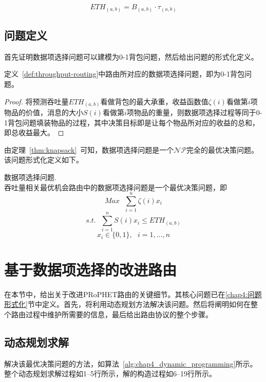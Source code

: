 \begin{equation}
ETH_{(a,b)}=B_{(a,b)}\cdot\tau_{(a,b)}
\label{eq:eth}
\end{equation}

\subsection{问题定义}

首先证明数据项选择问题可以建模为0-1背包问题，然后给出问题的形式化定义。

\begin{theorem}
\label{thm:knapsack}
定义~\ref{def:throughput-routing}中路由所对应的数据项选择问题，即为0-1背包问题。
\end{theorem}
\begin{proof}
将预测吞吐量$ETH_{(a,b)}$看做背包的最大承重，收益函数值$\zeta(i)$看做第$i$项物品的价值，消息的大小$S(i)$看做第$i$项物品的重量，则数据项选择过程等同于0-1背包问题填装物品的过程，其中决策目标即是让每个物品所对应的收益的总和，即总收益最大。
\end{proof}

由定理~\ref{thm:knapsack}~可知，数据项选择问题是一个$\mathcal{NP}$完全的最优决策问题。该问题形式化定义如下。

\begin{definition} 数据项选择问题.\\
吞吐量相关最优机会路由中的数据项选择问题是一个最优决策问题，即
\[
Max~~~\sum_{i=1}^{n}\zeta(i)x_i
\]\[
s.t.~~~\sum_{i=1}^{n}S(i)x_i\leq ETH_{(a,b)}
\]\[
x_i\in \{0,1\},~~~i=1,\ldots,n
\]
\end{definition}

\section{基于数据项选择的改进路由}
\label{chap4:基于数据项选择的改进路由}

在本节中，给出关于改进PRoPHET路由的关键细节。其核心问题已在\ref{chap4:问题形式化}节中定义。首先，将利用动态规划方法解决该问题。然后将阐明如何在整个路由过程中维护所需要的信息，最后给出路由协议的整个步骤。

\subsection{动态规划求解}

解决该最优决策问题的方法，如算法~\ref{alg:chap4_dynamic_programming}所示。整个动态规划求解过程如1--5行所示，解的构造过程如6--19行所示。

